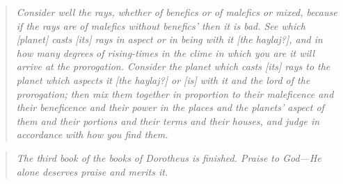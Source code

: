 \begin{quote}
\textsl{Consider well the rays, whether of benefics or of malefics or mixed, because if the rays are of malefics without benefics' then it is bad. See which [planet] casts [its] rays in aspect or in being with it [the haylaj?], and in how many degrees of rising-times in the clime in which you are it will arrive at the prorogation. Consider the planet which casts [its] rays to the planet which aspects it [the haylaj?] or [is] with it and the lord of the prorogation; then mix them together in proportion to their maleficence and their beneficence and their power in the places and the planets' aspect of them and their portions and their terms and their houses, and judge in accordance with how you find them.}
\end{quote}

\begin{quote}
\textsl{The third book of the books of Dorotheus is finished. Praise to God---He alone deserves praise and merits it.}
\end{quote}
